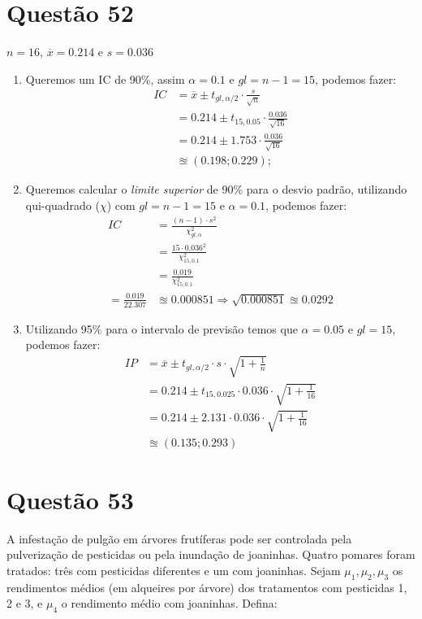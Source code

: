 \documentclass[12pt]{article}
\newcommand{\quest}[1]{\section*{Questão #1}} %
\begin{document}
\quest{52}
$n = 16$, $\overline{x} = 0.214$ e $s = 0.036$
\begin{enumerate}
    \item Queremos um IC de 90\%, assim $\alpha = 0.1$ e $gl = n-1 = 15$, podemos fazer:
    \begin{align*}
        IC &= \overline{x} \pm t_{gl,\alpha/2} \cdot \frac{s}{\sqrt{n}}\\
           &= 0.214 \pm t_{15,0.05} \cdot \frac{0.036}{\sqrt{16}}\\
           &= 0.214 \pm 1.753 \cdot \frac{0.036}{\sqrt{16}}\\
           &\approxeq (0.198;0.229);
    \end{align*}
    \item Queremos calcular o \textit{limite superior} de 90\% para o desvio padrão, utilizando qui-quadrado ($\chi$) com $gl = n-1 = 15$ e $\alpha=0.1$, podemos fazer:
    \begin{align*}
        IC &= \frac{(n-1)\cdot s^2}{\chi^2_{gl,\alpha}}\\
           &= \frac{15\cdot 0.036^2}{\chi^2_{15,0.1}}\\
           &= \frac{0.019}{\chi^2_{15,0.1}}\\
           = \frac{0.019}{22.307} &\approxeq 0.000851 \Rightarrow \sqrt{0.000851} \approxeq 0.0292
    \end{align*}
    \item Utilizando 95\% para o intervalo de previsão temos que $\alpha = 0.05$ e $gl = 15$, podemos fazer:
    \begin{align*}
        IP &= \overline{x} \pm t_{gl,\alpha/2}\cdot s\cdot\sqrt{1+\frac{1}{n}}\\
           &= 0.214 \pm t_{15,0.025} \cdot 0.036 \cdot \sqrt{1+\frac{1}{16}}\\
           &= 0.214 \pm 2.131 \cdot 0.036 \cdot \sqrt{1+\frac{1}{16}}\\
           &\approxeq (0.135;0.293)
    \end{align*}
\end{enumerate}

\quest{53}

A infestação de pulgão em árvores frutíferas pode ser controlada pela pulverização de pesticidas ou pela inundação de joaninhas. Quatro pomares foram tratados: três com pesticidas diferentes e um com joaninhas. Sejam \( \mu_1, \mu_2, \mu_3 \) os rendimentos médios (em alqueires por árvore) dos tratamentos com pesticidas 1, 2 e 3, e \( \mu_4 \) o rendimento médio com joaninhas. Defina:
\end{document}
